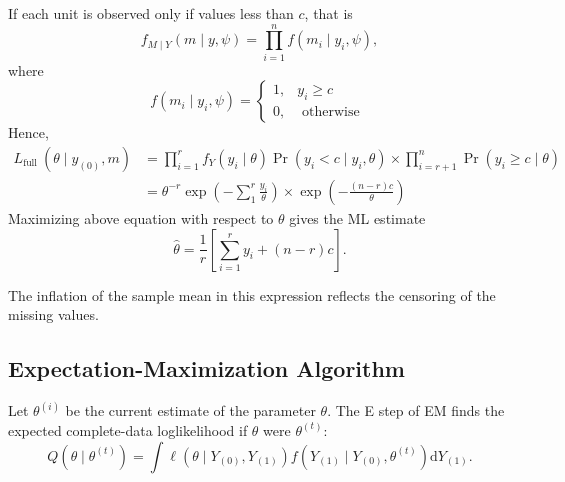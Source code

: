 \begin{example}
    If each unit is observed only if values less than $c$, that is
    \begin{equation}
        f_{M\mid Y}(m\mid y,\psi)=\prod_{i=1}^{n}f\left(m_{i}\mid y_{i},\psi\right),
    \end{equation}
    where
    \begin{equation}
        f\left(m_{i} \mid y_{i}, \psi\right)=\left\{\begin{array}{ll}
            1, & y_{i}\geq c        \\
            0, & \text{ otherwise }
        \end{array}\right.
    \end{equation}
    Hence,
    \begin{equation}
        \begin{aligned}
            L_{\text {full }}\left(\theta \mid y_{(0)}, m\right) & =\prod_{i=1}^{r} f_{Y}\left(y_{i} \mid \theta\right) \operatorname{Pr}\left(y_{i}<c \mid y_{i}, \theta\right) \times \prod_{i=r+1}^{n} \operatorname{Pr}\left(y_{i} \geq c \mid \theta\right) \\
                                                                 & =\theta^{-r} \exp \left(-\sum_{1}^{r} \frac{y_{i}}{\theta}\right) \times \exp \left(-\frac{(n-r) c}{\theta}\right)
        \end{aligned}
    \end{equation}
    Maximizing above equation with respect to $\theta$ gives the ML estimate
    \begin{equation}
        \hat{\theta}=\frac{1}{r}\left[\sum_{i=1}^{r}y_{i}+(n-r)c\right].
    \end{equation}

    The inflation of the sample mean in this expression reflects the censoring of the missing values.
\end{example}

\subsection{Expectation-Maximization Algorithm}

Let $\theta^{(i)}$ be the current estimate of the parameter $\theta .$ The E step of EM finds the expected complete-data loglikelihood if $\theta$ were $\theta^{(t)}$:
\begin{equation}
    Q\left(\theta \mid \theta^{(t)}\right)=\int\ell\left(\theta \mid Y_{(0)}, Y_{(1)}\right) f\left(Y_{(1)} \mid Y_{(0)}, \theta^{(t)}\right) \mathrm{d} Y_{(1)}.
\end{equation}

